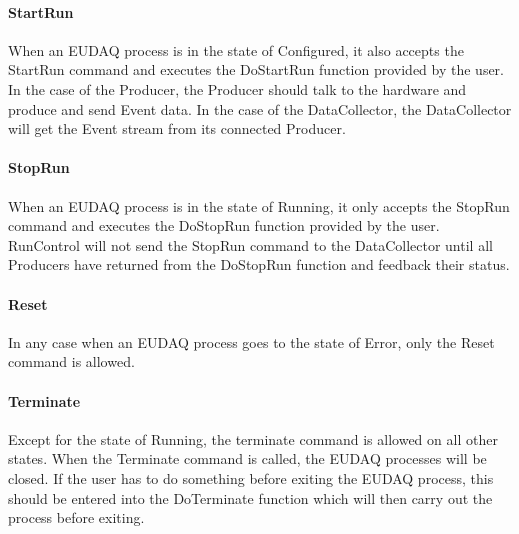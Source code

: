 \paragraph{StartRun}
When an EUDAQ process is in the state of Configured, it also accepts the StartRun command and executes the DoStartRun function provided by the user. In the case of the Producer, the Producer should talk to the hardware and produce and send Event data. In the case of the DataCollector, the DataCollector will get the Event stream from its connected Producer.

\paragraph{StopRun}
When an EUDAQ process is in the state of Running, it only accepts the StopRun command and executes the DoStopRun function provided by the user. RunControl will not send the StopRun command to the DataCollector until all Producers have returned from the DoStopRun function and feedback their status.

\paragraph{Reset}
In any case when an EUDAQ process goes to the state of Error, only the Reset command is allowed.

\paragraph{Terminate}
Except for the state of Running, the terminate command is allowed on all other states. When the Terminate command is called, the EUDAQ processes will be closed. If the user has to do something before exiting the EUDAQ process, this should be entered into the DoTerminate function which will then carry out the process before exiting.

